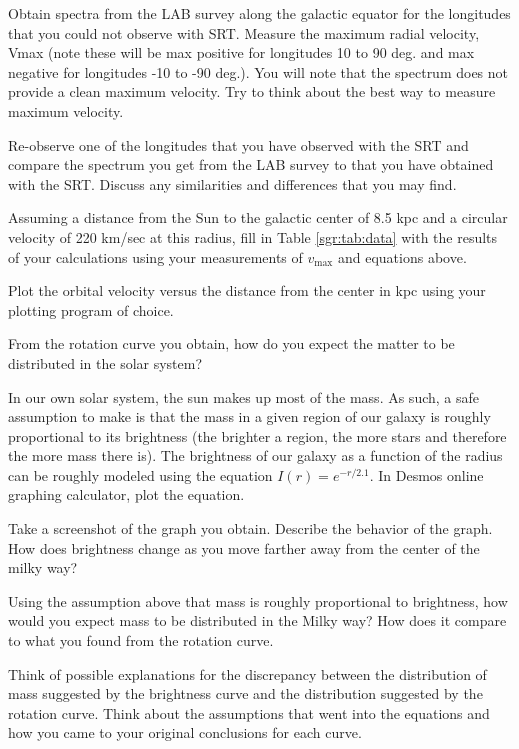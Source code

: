 \begin{steps}
	\item Obtain spectra from the LAB survey along the galactic equator for the
	longitudes that you could not observe with SRT. Measure the
	maximum radial velocity, Vmax (note these will be max positive for
	longitudes 10 to 90 deg. and max negative for longitudes -10 to -90
	deg.). You will note that the spectrum does not provide a clean
	maximum velocity. Try to think about the best way to measure
	maximum velocity.
	
	\item Re-observe one of the longitudes that you have observed with the SRT
	and compare the spectrum you get from the LAB survey to that you
	have obtained with the SRT. Discuss any similarities and differences
	that you may find. 
	
	\item Assuming a distance from the Sun to the galactic center of 8.5 kpc and
	a circular velocity of 220 km/sec at this radius, fill in Table \ref{sgr:tab:data} with the
	results of your calculations using your measurements of $v_\textrm{max}$ and
	equations above.
	
	\item Plot the orbital velocity versus the distance from the center in kpc using your plotting program of choice.
	
	\item From the rotation curve you obtain, how do you expect the matter to be distributed in the solar system?
	
	\item In our own solar system, the sun makes up most of the mass. As such, a safe assumption to make is that the mass in a given region of our galaxy is roughly proportional to its brightness (the brighter a region, the more stars and therefore the more mass there is). The brightness of our galaxy as a function of the radius can be roughly modeled using the equation $I(r) = e^{-r/2.1}$. In Desmos online graphing calculator, plot the equation. 
	
	\item Take a screenshot of the graph you obtain. Describe the behavior of the graph. How does brightness change as you move farther away from the center of the milky way?
	
	\item Using the assumption above that mass is roughly proportional to brightness, how would you expect mass to be distributed in the Milky way? How does it compare to what you found from the rotation curve. 
	
	\item Think of possible explanations for the discrepancy between the distribution of mass suggested by the brightness curve and the distribution suggested by the rotation curve. Think about the assumptions that went into the equations and how you came to your original conclusions for each curve. 
	
	
\end{steps}

